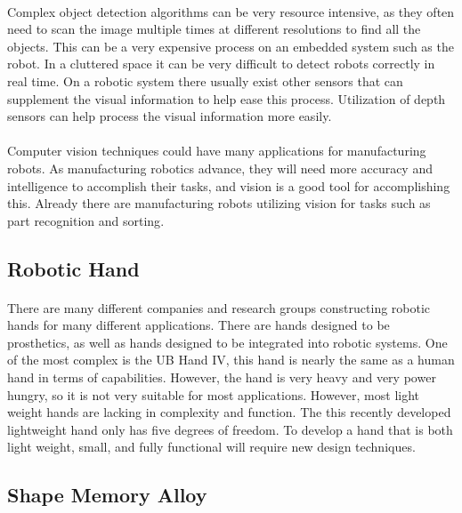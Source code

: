 \documentclass[letterpaper,12pt]{article}
\begin{document}
\paragraph{}Complex object detection algorithms can be very resource intensive,
as they often need to scan the image multiple times at different resolutions to
find all the objects\cite{Felzenszwalb2013}. This can be a very expensive
process on an embedded system such as the robot. In a cluttered space it can be
very difficult to detect robots correctly in real time. On a robotic system
there usually exist other sensors that can supplement the visual information to
help ease this process. Utilization of depth sensors can help process the visual
information more easily\cite{Gould2008}.

\paragraph{}Computer vision techniques could have many applications for
manufacturing robots. As manufacturing robotics advance, they will need more
accuracy and intelligence to accomplish their tasks, and vision is a good tool
for accomplishing this. Already there are manufacturing robots utilizing vision
for tasks such as part recognition and sorting\cite{SIRfuture}.

\subsection{Robotic Hand}
\paragraph{}There are many different companies and research groups constructing
robotic hands for many different applications. There are hands designed to be
prosthetics, as well as hands designed to be integrated into robotic systems.
One of the most complex is the UB Hand IV, this hand is nearly the same as a
human hand in terms of capabilities. However, the hand is very heavy and very
power hungry, so it is not very suitable for most
applications\cite{Melchiorri2013}. However, most light weight hands are lacking
in complexity and function. The this recently developed lightweight hand only
has five degrees of freedom\cite{takaki2011high}. To develop a hand that is both
light weight, small, and fully functional will require new design techniques. 

\subsection{Shape Memory Alloy}
\end{document}
